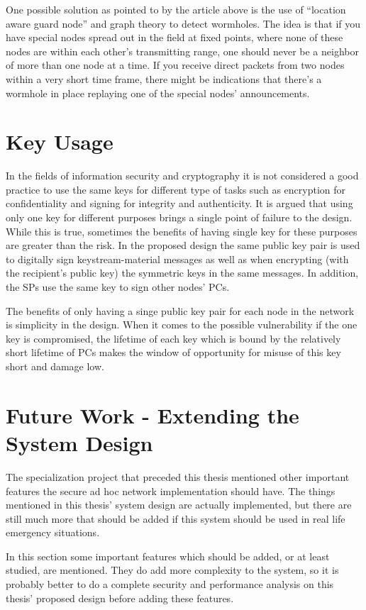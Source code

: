 One possible solution as pointed to by the article above is the use of
``location aware guard node'' and graph theory \cite{poovendran2007graph}
\cite{lazos2005preventing} to detect wormholes. The idea is that if you have
special nodes spread out in the field at fixed points, where none of these nodes
are within each other's transmitting range, one should never be a neighbor of
more than one node at a time. If you receive direct packets from two nodes
within a very short time frame, there might be indications that there's a
wormhole in place replaying one of the special nodes' announcements.

\section{Key Usage}
In the fields of information security and cryptography it is not considered a
good practice to use the same keys for different type of tasks such as
encryption for confidentiality and signing for integrity and authenticity. It is
argued that using only one key for different purposes brings a single point of
failure to the design. While this is true, sometimes the benefits of having
single key for these purposes are greater than the risk. In the proposed design
the same public key pair is used to digitally sign keystream-material messages
as well as when encrypting (with the recipient's public key) the symmetric keys
in the same messages. In addition, the \acp{SP} use the same key to sign other
nodes' \acp{PC}.

The benefits of only having a singe public key pair for each node in the network
is simplicity in the design. When it comes to the possible vulnerability if the
one key is compromised, the lifetime of each key which is bound by the
relatively short lifetime of \acp{PC} makes the window of opportunity for misuse
of this key short and damage low.

\section{Future Work - Extending the System Design}
The specialization project \cite{bowitz_graarud} that preceded this thesis
mentioned other important features the secure ad hoc network implementation
should have. The things mentioned in this thesis' system design are actually
implemented, but there are still much more that should be added if this system
should be used in real life emergency situations.

In this section some important features which should be added, or at least
studied, are mentioned. They do add more complexity to the system, so it is
probably better to do a complete security and performance analysis on this
thesis' proposed design before adding these features.

